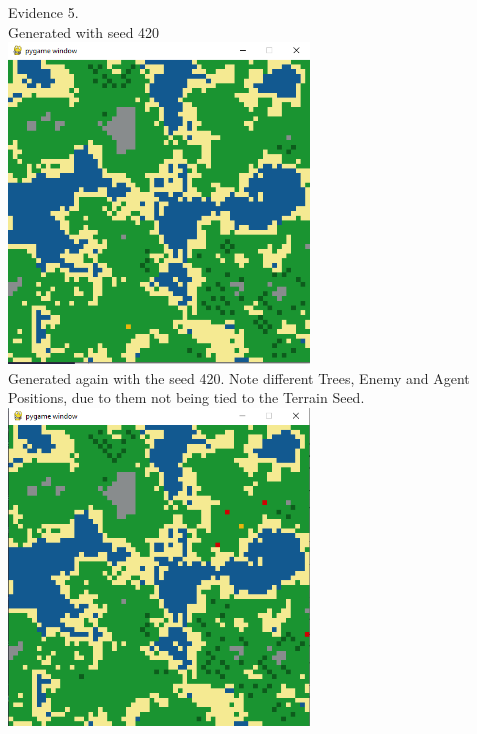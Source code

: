 \begin{flushleft}
\begin{center}
        {\large Evidence 5.\rn } \\ 
        \vspace{0.3cm}
        Generated with seed 420 \\
        \includegraphics[width=8cm]{Images/Testing/T5.9.1.PNG} \\
        Generated again with the seed 420. Note different Trees, Enemy and Agent Positions, due to them not being
        tied to the Terrain Seed. \\
        \includegraphics[width=8cm]{Images/Testing/T5.9.2.PNG} \\
        \vspace{1cm}
        
    \end{center}
\end{flushleft}